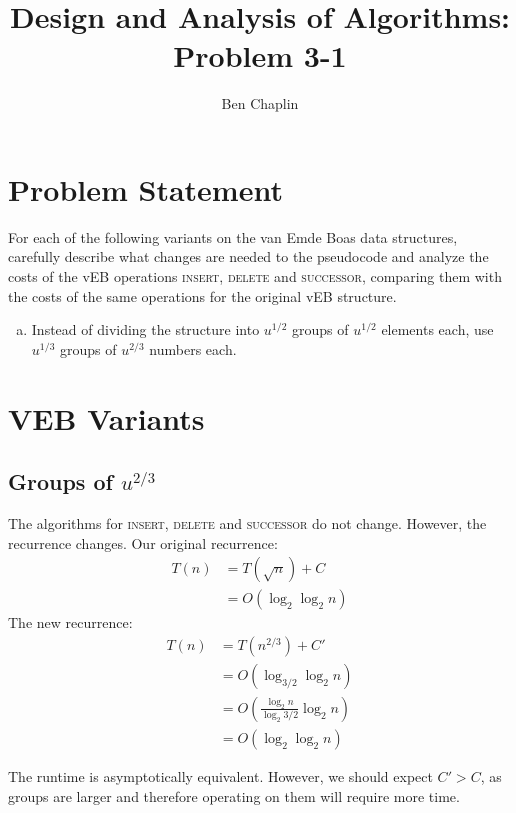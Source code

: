 \documentclass[11pt]{article}
\title{Design and Analysis of Algorithms: Problem 3-1}
\author{Ben Chaplin}
\date{}
\theoremstyle{plain}
\theoremstyle{definition}
\begin{document}
\maketitle
\tableofcontents

\section{Problem Statement}

For each of the following variants on the van Emde Boas data structures, carefully describe what
changes are needed to the pseudocode and analyze the costs of the vEB operations \textsc{insert},
\textsc{delete} and \textsc{successor}, comparing them with the costs of the same operations for the 
original vEB structure.

\begin{enumerate}[a)]
    \item Instead of dividing the structure into $u^{1/2}$ groups of $u^{1/2}$ elements each, use 
    $u^{1/3}$ groups of $u^{2/3}$ numbers each.
\end{enumerate}

\section{VEB Variants}
\subsection{Groups of $u^{2/3}$}

The algorithms for \textsc{insert}, \textsc{delete} and \textsc{successor} do not change. However, 
the recurrence changes. Our original recurrence: 
\begin{align*}
    T(n) &= T(\sqrt{n}) + C\\
         &= O(\log_2\log_2 n) 
\end{align*}
The new recurrence:
\begin{align*}
    T(n) &= T(n^{2/3}) + C'\\
         &= O(\log_{3/2}\log_2 n)\\
         &= O\left(\frac{\log_2 n}{\log_2 3/2}\log_2 n\right)\\
         &= O(\log_2\log_2 n) 
\end{align*}

The runtime is asymptotically equivalent. However, we should expect $C' > C$, as groups are larger 
and therefore operating on them will require more time.
\end{document}
